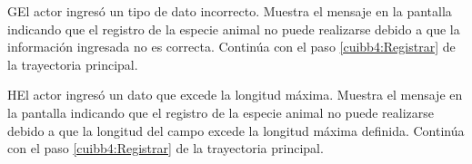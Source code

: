         \begin{UCtrayectoriaA}{G}{El actor ingresó un tipo de dato incorrecto.}    
    \UCpaso[\UCsist] Muestra el mensaje  en la pantalla  indicando que el registro de la especie animal no puede realizarse debido a que la información ingresada no es correcta.
    \UCpaso[] Continúa con el paso \ref{cuibb4:Registrar} de la trayectoria principal.     
    \end{UCtrayectoriaA}
    
            \begin{UCtrayectoriaA}{H}{El actor ingresó un dato que excede la longitud máxima.}    
    \UCpaso[\UCsist] Muestra el mensaje  en la pantalla  indicando que el registro de la especie animal no puede realizarse debido a que la longitud del campo excede la longitud máxima definida.
    \UCpaso[] Continúa con el paso \ref{cuibb4:Registrar} de la trayectoria principal.     
    \end{UCtrayectoriaA}
